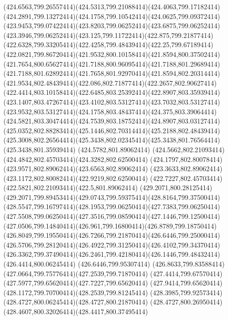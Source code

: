 {{	\curveto(424.6563,799.26557414)(424.5313,799.21088414)(424.4063,799.17182414)
	\curveto(424.2891,799.13272414)(424.1758,799.10542414)(424.0625,799.09372414)
	\curveto(423.9453,799.07422414)(423.8203,799.06252414)(423.6875,799.06252414)
	\curveto(423.3946,799.06252414)(423.125,799.11722414)(422.875,799.21877414)
	\curveto(422.6328,799.33205414)(422.4258,799.48439414)(422.25,799.67189414)
	\curveto(422.0821,799.86720414)(421.9532,800.10158414)(421.8594,800.37502414)
	\curveto(421.7654,800.65627414)(421.7188,800.96095414)(421.7188,801.29689414)
	\curveto(421.7188,801.62892414)(421.7658,801.92970414)(421.8594,802.20314414)
	\curveto(421.9534,802.48439414)(422.086,802.71877414)(422.2657,802.90627414)
	\curveto(422.4414,803.10158414)(422.6485,803.25392414)(422.8907,803.35939414)
	\curveto(423.1407,803.47267414)(423.4102,803.53127414)(423.7032,803.53127414)
	\curveto(423.9532,803.53127414)(424.1758,803.48437414)(424.375,803.39064414)
	\curveto(424.5821,803.30474414)(424.7539,803.18752414)(424.8907,803.03127414)
	\curveto(425.0352,802.88283414)(425.1446,802.70314414)(425.2188,802.48439414)
	\curveto(425.3008,802.26564414)(425.3438,802.02345414)(425.3438,801.76564414)
	\lineto(425.3438,801.35939414)
	\closepath
	\moveto(424.5782,801.89062414)
	\curveto(424.5662,802.21093414)(424.4842,802.45703414)(424.3282,802.62500414)
	\curveto(424.1797,802.80078414)(423.9571,802.89062414)(423.6563,802.89062414)
	\curveto(423.3633,802.89062414)(423.1172,802.80082414)(422.9219,802.62500414)
	\curveto(422.7227,802.45703414)(422.5821,802.21093414)(422.5,801.89062414)
	\closepath
	\moveto(429.2071,800.28125414)
	\curveto(429.2071,799.89453414)(429.0743,799.59375414)(428.8164,799.37500414)
	\curveto(428.5547,799.16797414)(428.1953,799.06250414)(427.7383,799.06250414)
	\curveto(427.5508,799.06250414)(427.3516,799.08590414)(427.1446,799.12500414)
	\curveto(427.0506,799.14840414)(426.961,799.16800414)(426.8789,799.18750414)
	\curveto(426.8049,799.19550414)(426.7266,799.21870414)(426.6446,799.25000414)
	\curveto(426.5706,799.28120414)(426.4922,799.31250414)(426.4102,799.34370414)
	\curveto(426.3362,799.37490414)(426.2461,799.42180414)(426.1446,799.48432414)
	\lineto(426.4414,800.06245414)
	\lineto(426.6446,799.95307414)
	\curveto(426.8633,799.83588414)(427.0664,799.75776414)(427.2539,799.71870414)
	\curveto(427.4414,799.67570414)(427.5977,799.65620414)(427.7227,799.65620414)
	\curveto(427.9414,799.65620414)(428.1172,799.70700414)(428.2539,799.81245414)
	\curveto(428.3985,799.92573414)(428.4727,800.06245414)(428.4727,800.21870414)
	\curveto(428.4727,800.26950414)(428.4607,800.32026414)(428.4417,800.37495414)
}}
